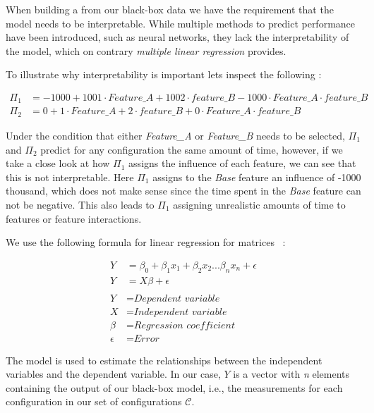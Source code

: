 When building a \perfInfluenceModel from our black-box data we have the requirement that the model needs to be interpretable. While multiple 
methods to predict performance have been introduced, such as neural networks, they lack the interpretability of the model, which on contrary
\emph{multiple linear regression} provides.

To illustrate why interpretability is important lets inspect the following \perfInfluenceModel:

\begin{align*}
    \Pi_1 &= -1000 + 1001 \cdot \textit{Feature\_A} + 1002 \cdot \textit{feature\_B} - 1000 \cdot \textit{Feature\_A} \cdot \textit{feature\_B} \\
    \Pi_2 &= 0 + 1 \cdot \textit{Feature\_A} + 2 \cdot \textit{feature\_B} + 0 \cdot \textit{Feature\_A} \cdot \textit{feature\_B}
\end{align*}

Under the condition that either \textit{Feature\_A} or \textit{Feature\_B} needs to be selected, 
$\Pi_1$ and $\Pi_2$ predict for any configuration the same amount of time, however, 
if we take a close look at how $\Pi_1$ assigns the influence of each feature, we can see that this is not interpretable. 
Here $\Pi_1$ assigns to the \textit{Base} feature an influence of -1000 thousand, 
which does not make sense since the time spent in the \textit{Base} feature can not be negative. 
This also leads to $\Pi_1$ assigning unrealistic amounts of time to features or feature interactions. 

We use the following formula for linear regression for matrices ~\cite{Linear-Regression-Performance}:

\begin{align}\label{formula:linReg}
    Y &= \beta_0 + \beta_1 x_1 + \beta_2 x_2 ... \beta_n x_n + \epsilon   \\
    Y &= X \beta + \epsilon \nonumber\\ \nonumber \\ \nonumber
    Y &= \textit{Dependent variable}\\ \nonumber
    X &= \textit{Independent variable}\\ \nonumber
    \beta &= \textit{Regression coefficient}\\ \nonumber
    \epsilon &= \textit{Error} \nonumber
\end{align}

The model is used to estimate the relationships between the independent variables and the dependent variable.
In our case, $Y$ is a vector with \textit{n}  elements containing the output of our black-box model,
i.e., the measurements for each configuration in our set of configurations $\mathcal{C}$. 

